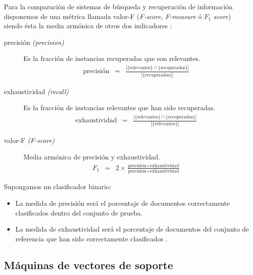 Para la comparación de sistemas de búsqueda y recuperación de información disponemos de una métrica llamada valor-F (\emph{F-score}, \emph{F-measure} ó \emph{$F_1$ score}) siendo ésta la media armónica de otros dos indicadores \citep[Precisión y exhaustividad]{wikipedia-es}:
\begin{description}
\item[precisión \emph{(precision)}] 
Es la fracción de instancias recuperadas que son relevantes.
\begin{eqnarray}
\text{precisión} &=& \frac{|\{\text{relevantes}\}\cap\{\text{recuperados}\}|}{|\{\text{recuperados}\}|}
\end{eqnarray}
\item[exhaustividad \emph{(recall)}] 
Es la fracción de instancias relevantes que han sido recuperadas.
\begin{eqnarray}
\text{exhaustividad} &=& \frac{|\{\text{relevantes}\}\cap\{\text{recuperados}\}|}{|\{\text{relevantes}\}|}
\end{eqnarray}
\item[valor-F \emph{(F-score)}] Media armónica de precisión y exhaustividad.
\begin{eqnarray}
F_1 &=& 2\times\frac{\text{precisión}\times\text{exhaustividad}}{\text{precisión}+\text{exhaustividad}}
\end{eqnarray}
\end{description}

Supongamos un clasificador binario:
\begin{itemize}
\item La medida de precisión será el porcentaje de documentos correctamente clasificados dentro del conjunto de prueba.
\item La medida de exhaustividad será el porcentaje de documentos del conjunto de referencia que han sido correctamente clasificados \citep{Perkins2010}.
\end{itemize}

\subsection{Máquinas de vectores de soporte}
